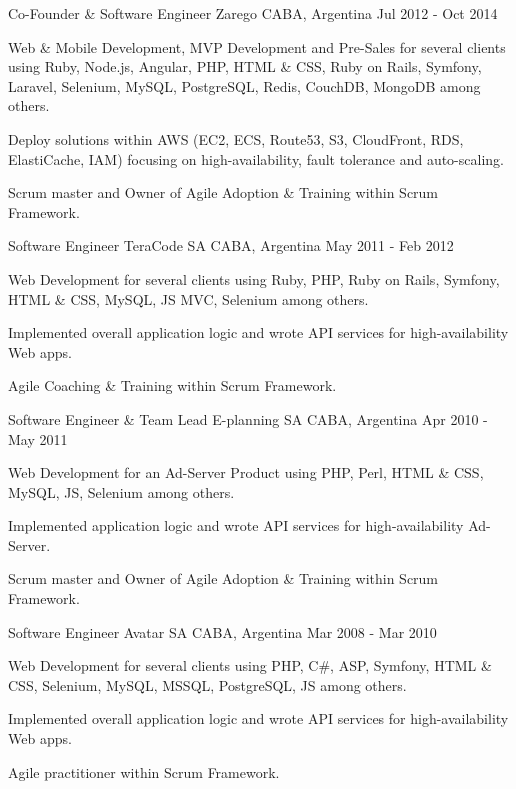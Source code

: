 \begin{cventries}
  \cventry
    {Co-Founder \& Software Engineer}
    {Zarego}
    {CABA, Argentina}
    {Jul 2012 - Oct 2014}
    {
      \begin{cvitems}
        \item {Web \& Mobile Development, MVP Development and Pre-Sales for several clients using Ruby, Node.js, Angular, PHP, HTML \& CSS, Ruby on Rails, Symfony, Laravel, Selenium, MySQL, PostgreSQL, Redis, CouchDB, MongoDB  among others.}
        \item {Deploy solutions within AWS (EC2, ECS, Route53, S3, CloudFront, RDS, ElastiCache, IAM) focusing on high-availability, fault tolerance and auto-scaling.}
        \item {Scrum master and Owner of Agile Adoption \& Training within Scrum Framework.}
      \end{cvitems}
    }

  \cventry
    {Software Engineer}
    {TeraCode SA}
    {CABA, Argentina}
    {May 2011 - Feb 2012}
    {
      \begin{cvitems}
        \item {Web Development for several clients using Ruby, PHP, Ruby on Rails, Symfony, HTML \& CSS, MySQL, JS MVC, Selenium among others.}
        \item {Implemented overall application logic and wrote API services for high-availability Web apps.}
        \item {Agile Coaching \& Training within Scrum Framework.}
      \end{cvitems}
    }

  \cventry
    {Software Engineer \& Team Lead}
    {E-planning SA}
    {CABA, Argentina}
    {Apr 2010 - May 2011}
    {
      \begin{cvitems}
        \item {Web Development for an Ad-Server Product using PHP, Perl, HTML \& CSS, MySQL, JS, Selenium among others.}
        \item {Implemented application logic and wrote API services for high-availability Ad-Server.}
        \item {Scrum master and Owner of Agile Adoption \& Training within Scrum Framework.}
      \end{cvitems}
    }

  \cventry
    {Software Engineer}
    {Avatar SA}
    {CABA, Argentina}
    {Mar 2008 - Mar 2010}
    {
      \begin{cvitems}
        \item {Web Development for several clients using PHP, C\#, ASP, Symfony, HTML \& CSS, Selenium, MySQL, MSSQL, PostgreSQL, JS among others.}
        \item {Implemented overall application logic and wrote API services for high-availability Web apps.}
        \item {Agile practitioner within Scrum Framework.}
      \end{cvitems}
    }


\end{cventries}
